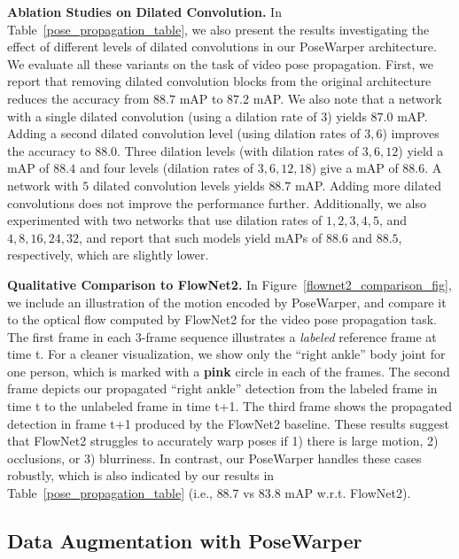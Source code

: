 \documentclass{article}
\begin{document}
\textbf{Ablation Studies on Dilated Convolution.} In Table~\ref{pose_propagation_table}, we also present the results investigating the effect of different levels of dilated convolutions in our PoseWarper architecture. We evaluate all these variants on the task of video pose propagation. First, we report that removing dilated convolution blocks from the original architecture reduces the accuracy from $88.7$ mAP to $87.2$ mAP. We also note that a network with a single dilated convolution (using a dilation rate of $3$) yields $87.0$ mAP.  Adding a second dilated convolution level (using dilation rates of $3,6$) improves the accuracy to $88.0$.  Three dilation levels (with dilation rates of $3,6,12$) yield a mAP of $88.4$ and four levels (dilation rates of $3,6,12,18$) give a mAP of $88.6$. A network with $5$ dilated convolution levels yields $88.7$ mAP. Adding more dilated convolutions does not improve the performance further. Additionally, we also experimented with two networks that use dilation rates of $1,2,3,4,5$, and $4,8,16,24,32$, and report that such models yield mAPs of $88.6$ and $88.5$, respectively, which are slightly lower.




\textbf{Qualitative Comparison to FlowNet2.} In Figure~\ref{flownet2_comparison_fig}, we include an illustration of the motion encoded by PoseWarper, and compare it to the optical flow computed by FlowNet2 for the video pose propagation task. The first frame in each $3$-frame sequence illustrates a {\em labeled} reference frame at time t. For a cleaner visualization, we show only the ``right ankle'' body joint for one person, which is marked with a \textbf{{\color{RubineRed} pink}} circle in each of the frames. The second frame depicts our propagated ``right ankle'' detection from the labeled frame in time t to the unlabeled frame in time t+1. The third frame shows the propagated detection in frame t+1 produced by the FlowNet2 baseline. These results suggest that FlowNet2 struggles to accurately warp poses if 1) there is large motion, 2) occlusions, or 3) blurriness. In contrast, our PoseWarper handles these cases robustly, which is also indicated by our results in Table~\ref{pose_propagation_table} (i.e., $88.7$ vs $83.8$ mAP w.r.t. FlowNet2).

 
\subsection{Data Augmentation with PoseWarper}
\end{document}
